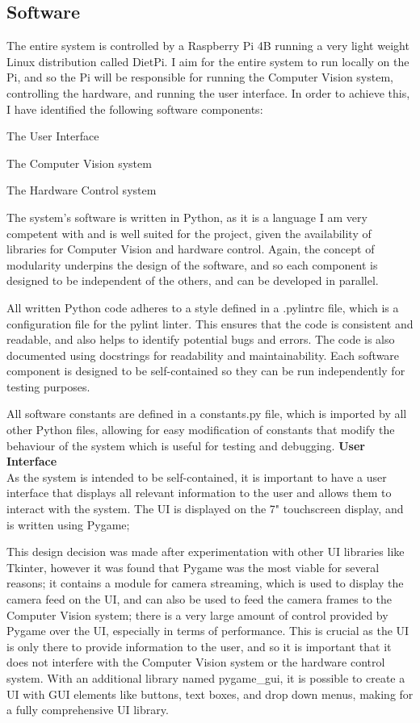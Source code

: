 \subsection{Software}
The entire system is controlled by a Raspberry Pi 4B running a very light weight Linux distribution called DietPi.
I aim for the entire system to run locally on the Pi, and so the Pi will be responsible for running the Computer Vision system,
controlling the hardware, and running the user interface. In order to achieve this, I have identified the following software components:
\begin{mylist}
  \item The User Interface
  \item The Computer Vision system
  \item The Hardware Control system
\end{mylist}
The system's software is written in Python\cite{python}, as it is a language I am very competent with and is well suited for the project, given the 
availability of libraries for Computer Vision and hardware control. Again, the concept of modularity underpins the design of the software,
and so each component is designed to be independent of the others, and can be developed in parallel.

All written Python code adheres to a style defined in a .pylintrc file, which is a configuration file for the pylint\cite{pylint} linter. This ensures
that the code is consistent and readable, and also helps to identify potential bugs and errors. The code is also documented using docstrings for 
readability and maintainability. Each software component is designed to be self-contained so they can be run independently for testing purposes.

All software constants are defined in a constants.py file, which is imported by all other Python files, allowing for easy modification of constants
that modify the behaviour of the system which is useful for testing and debugging.
\noindent
\textbf{User Interface} \\
As the system is intended to be self-contained, it is important to have a user interface that displays all relevant information to the user
and allows them to interact with the system. The UI is displayed on the 7" touchscreen display, and is written using Pygame\cite{pygamedoc};

This design decision was made after experimentation with other UI libraries like Tkinter\cite{tkinterdoc}, however it was found that Pygame was the most
viable for several reasons; it contains a module for camera streaming, which is used to display the camera feed on the UI, and can also be used to
feed the camera frames to the Computer Vision system; there is a very large amount of control provided by Pygame over the UI, especially in terms of 
performance. This is crucial as the UI is only there to provide information to the user, and so it is important that it does not interfere with the
Computer Vision system or the hardware control system. With an additional library named pygame\_gui\cite{pygamegui}, it is possible to create a UI with 
GUI elements like buttons, text boxes, and drop down menus, making for a fully comprehensive UI library.

